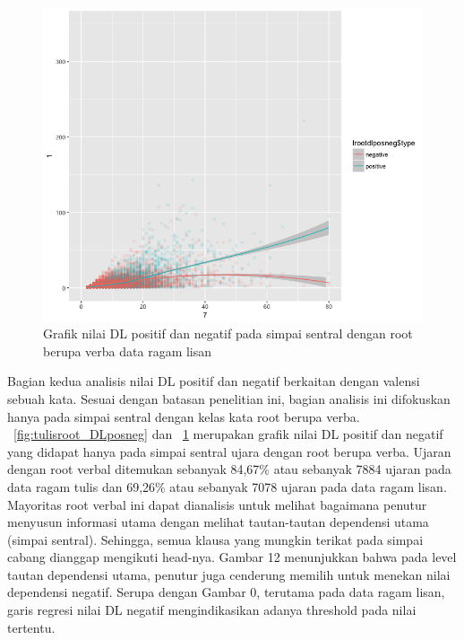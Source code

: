 \begin{figure}
	\centering \includegraphics[width=1
	\textwidth] {pics/lisanroot_DLposneg.png} 
	\caption{Grafik nilai DL positif dan negatif pada simpai sentral dengan root berupa verba data ragam lisan}
	\label{fig:lisanroot_DLposneg} 
\end{figure}

Bagian kedua analisis nilai DL positif dan negatif berkaitan dengan valensi sebuah kata. Sesuai dengan batasan penelitian ini, bagian analisis ini difokuskan hanya pada simpai sentral dengan kelas kata root berupa verba. \pic~\ref{fig:tulisroot_DLposneg} dan \pic~\ref{fig:lisanroot_DLposneg} merupakan grafik nilai DL positif dan negatif  yang didapat hanya pada simpai sentral ujara dengan root berupa verba. Ujaran dengan root verbal ditemukan sebanyak 84,67\% atau sebanyak 7884 ujaran pada data ragam tulis dan 69,26\% atau sebanyak 7078 ujaran pada data ragam lisan. Mayoritas root verbal ini dapat dianalisis untuk melihat bagaimana penutur menyusun informasi utama dengan melihat tautan-tautan dependensi utama (simpai sentral). Sehingga, semua klausa yang mungkin terikat pada simpai cabang dianggap mengikuti head-nya. Gambar 12 menunjukkan bahwa pada level tautan dependensi utama, penutur juga cenderung memilih untuk menekan nilai dependensi negatif. Serupa dengan Gambar 0, terutama pada data ragam lisan, garis regresi nilai DL negatif mengindikasikan adanya threshold pada nilai tertentu. 	

